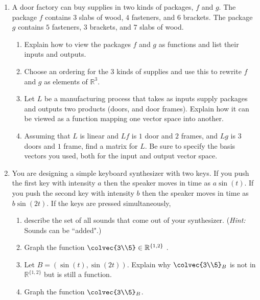 


\begin{enumerate}

\item A door factory can buy supplies in two kinds of packages, $f$ and $g$. 
The package $f$ contains $3$ slabs of wood, $4$ fasteners, and $6$ brackets. 
The package $g$ contains $5$ fasteners, $3$ brackets, and $7$ slabs of wood. 
\begin{enumerate}
\item Explain how to view the packages $f$ and $g$ as functions and list their inputs and outputs. \\
\item Choose  an ordering for  the 3 kinds of supplies and use this to  rewrite $f$ and $g$ as elements of $\mathbb{R}^3$.\\
\item Let $L$ be a manufacturing process that takes as inputs supply packages and outputs two products (doors, and door frames). Explain how it  can be viewed as a function 
mapping one vector space into another. 
\item
Assuming that $L$ is linear and  $Lf$ is $1$ door and $2$ frames, and $Lg$ is $3$ doors and $1$ frame, find a matrix for $L$. Be sure to specify the basis vectors you used, both for the input and output vector space.
\end{enumerate}


\item You are designing a simple keyboard synthesizer with two keys. 
If you push the first key with intensity $a$ then the speaker moves in time as $a\sin(t)$.
If you push the second key with intensity $b$ then the speaker moves in time as $b\sin(2t)$. 
If the keys are pressed simultaneously, \\
\begin{enumerate}
\item describe the set of all sounds that come out of your synthesizer. 
({\itshape Hint:} Sounds can be ``added".)\\
\item  Graph the  function $\colvec{3\\5}\in \mathbb{R}^{\{1,2\}}$ .
\item Let $B=(\sin(t), \sin(2t))$. 
Explain why $\colvec{3\\5}_B$ is not in $\mathbb{R}^{\{1,2\}}$ but is still a function.
\item Graph the function $\colvec{3\\5}_B$.
\end{enumerate}


\end{enumerate}
